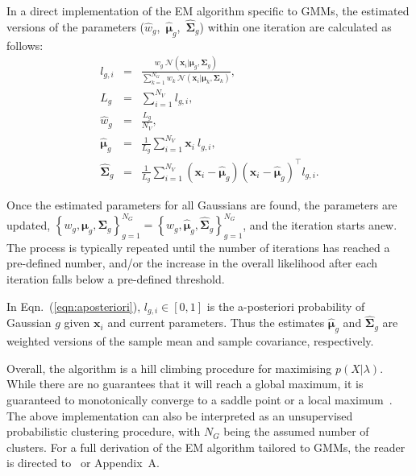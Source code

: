 \documentclass[10pt,a4paper]{article}
\def\Vec#1{{\boldsymbol{#1}}}
\def\Mat#1{{\boldsymbol{#1}}}
\begin{document}
In a direct implementation of the EM algorithm specific to GMMs,
the estimated versions of the parameters \mbox{($\widehat{w}_g$, $\widehat{\Vec{\mu}}_g$, $\widehat{\Mat{\Sigma}}_g$)}
within one iteration are calculated as follows:
%
\begin{eqnarray}
  l_{g,i}                  & = & \frac{w_g ~ {{\mathcal{N}}}( \Vec{x}_i | \Vec{\mu}_g, \Mat{\Sigma}_g )}{\sum\nolimits_{k=1}^{N_G} w_k ~ {{\mathcal{N}}}( \Vec{x}_i | \Vec{\mu}_k, \Mat{\Sigma}_k )}, \label{eqn:aposteriori} \\
  L_g                      & = & \sum\nolimits_{i=1}^{N_V} l_{g,i}, \label{eqn:em_sum_lhood} \\
  \widehat{w}_g            & = & \frac{L_g}{N_V},  \label{eqn:em_weight} \\
  \widehat{\Vec{\mu}}_g    & = & \frac{1}{L_g} \sum\nolimits_{i=1}^{N_V} \Vec{x}_i ~ l_{g,i}  \label{eqn:em_mean}, \\
  \widehat{\Mat{\Sigma}}_g & = & \frac{1}{L_g} \sum\nolimits_{i=1}^{N_V} (\Vec{x}_i - \widehat{\Vec{\mu}}_g)(\Vec{x}_i - \widehat{\Vec{\mu}}_g)^\top l_{g,i}. \label{eqn:em_cov}
\end{eqnarray}

Once the estimated parameters for all Gaussians are found, the parameters are updated,
{\small $\left\{ w_g, \Vec{\mu}_g, \Mat{\Sigma}_g \right\}_{g=1}^{N_G} = \left\{ \widehat{w}_g, \widehat{\Vec{\mu}}_g, \widehat{\Mat{\Sigma}}_g \right\}_{g=1}^{N_G}$},
and the iteration starts anew.
The process is typically repeated until the number of iterations has reached a pre-defined number,
and/or the increase in the overall likelihood after each iteration falls below a pre-defined threshold.

In Eqn.~(\ref{eqn:aposteriori}), $l_{g,i} \in [0,1]$ is the {a-posteriori} probability of Gaussian $g$ given $\Vec{x}_i$ and current parameters.
Thus the estimates $\widehat{\Vec{\mu}}_g$ and $\widehat{\Mat{\Sigma}}_g$ are weighted versions of the
sample mean and sample covariance, respectively.

Overall, the algorithm is a hill climbing procedure for maximising $p(X | \lambda)$.
While there are no guarantees that it will reach a global maximum, it is guaranteed to monotonically converge to a saddle point or a local maximum~\cite{Dempster77,Duda01,Mitchell97}.
The above implementation can also be interpreted as an unsupervised probabilistic clustering procedure,
with $N_G$ being the assumed number of clusters.
For a full derivation of the EM algorithm tailored to GMMs, the reader is directed to~\cite{Bilmes98,Redner84} or Appendix~A. %
\end{document}
